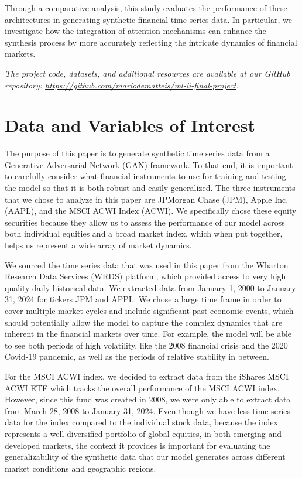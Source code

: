 \documentclass{article}
\begin{document}
Through a comparative analysis, this study evaluates the performance of these architectures in generating synthetic financial time series data. In particular, we investigate how the integration of attention mechanisms can enhance the synthesis process by more accurately reflecting the intricate dynamics of financial markets.

\vspace{1em}
\noindent\textit{The project code, datasets, and additional resources are available at our GitHub repository: \url{https://github.com/mariodematteis/ml-ii-final-project}.}

\section{Data and Variables of Interest}

The purpose of this paper is to generate synthetic time series data from a Generative Adversarial Network (GAN) framework. To that end, it is important to carefully consider what financial instruments to use for training and testing the model so that it is both robust and easily generalized. The three instruments that we chose to analyze in this paper are JPMorgan Chase (JPM), Apple Inc. (AAPL), and the MSCI ACWI Index (ACWI). We specifically chose these equity securities because they allow us to assess the performance of our model across both individual equities and a broad market index, which when put together, helps us represent a wide array of market dynamics.

We sourced the time series data that was used in this paper from the Wharton Research Data Services (WRDS) platform, which provided access to very high quality daily historical data. We extracted data from January 1, 2000 to January 31, 2024 for tickers JPM and APPL. We chose a large time frame in order to cover multiple market cycles and include significant past economic events, which should potentially allow the model to capture the complex dynamics that are inherent in the financial markets over time. For example, the model will be able to see both periods of high volatility, like the 2008 financial crisis and the 2020 Covid-19 pandemic, as well as the periods of relative stability in between.

For the MSCI ACWI index, we decided to extract data from the iShares MSCI ACWI ETF which tracks the overall performance of the MSCI ACWI index. However, since this fund was created in 2008, we were only able to extract data from March 28, 2008 to January 31, 2024. Even though we have less time series data for the index compared to the individual stock data, because the index represents a well diversified portfolio of global equities, in both emerging and developed markets, the context it provides is important for evaluating the generalizability of the synthetic data that our model generates across different market conditions and geographic regions.
\end{document}
